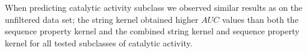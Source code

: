 When predicting catalytic activity subclass we observed similar results as on the unfiltered data set; the string kernel obtained higher $AUC$ values than both the sequence property kernel and the combined string kernel and sequence property kernel for all tested subclasses of catalytic activity.
%
%
%


